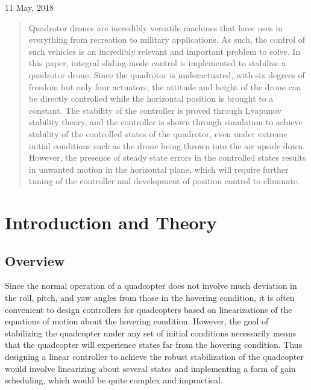 \documentclass[12pt]{article}
\begin{document}
\begin{titlepage}


{\large 11 May, 2018}\\[2cm]



\vfill %

\end{titlepage}
\newpage

\newpage
\tableofcontents{}
\newpage

\begin{abstract}
\normalsize
Quadrotor drones are incredibly versatile machines that have uses in everything from recreation to military applications. As such, the control of such vehicles is an incredibly relevant and important problem to solve. In this paper, integral sliding mode control is implemented to stabilize a quadrotor drone. Since the quadrotor is underactuated, with six degrees of freedom but only four actuators, the attitude and height of the drone can be directly controlled while the horizontal position is brought to a constant. The stability of the controller is proved through Lyapunov stability theory, and the controller is shown through simulation to achieve stability of the controlled states of the quadrotor, even under extreme initial conditions such as the drone being thrown into the air upside down. However, the presence of steady state errors in the controlled states results in unwanted motion in the horizontal plane, which will require further tuning of the controller and development of position control to eliminate.
\end{abstract}

\newpage
\section{Introduction and Theory}
\subsection{Overview}
Since the normal operation of a quadcopter does not involve much deviation in the roll, pitch, and yaw angles from those in the hovering condition, it is often convenient to design controllers for quadcopters based on linearizations of the equations of motion about the hovering condition. However, the goal of stabilizing the quadcopter under any set of initial conditions necessarily means that the quadcopter will experience states far from the hovering condition. Thus designing a linear controller to achieve the robust stabilization of the quadcopter would involve linearizing about several states and implementing a form of gain scheduling, which would be quite complex and impractical.
\end{document}
